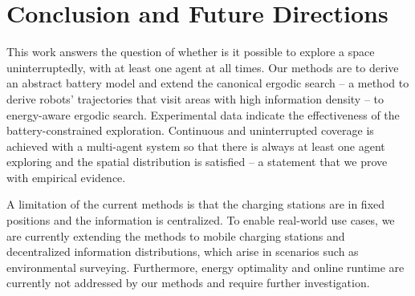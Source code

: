\documentclass[letterpaper,10pt,conference,twoside]{IEEEtran}
\theoremstyle{definition}
\begin{document}
\section{Conclusion and Future Directions}\label{sec:conc}
\noindent
This work %
answers the question of whether is it possible to explore a space uninterruptedly, with at least one agent at all times. %
Our methods are to derive an abstract battery model and extend the canonical ergodic search -- a method to derive robots' trajectories that visit areas with high information density -- to energy-aware ergodic search. %
Experimental data indicate the effectiveness of the battery-constrained exploration. Continuous and uninterrupted coverage is achieved with a multi-agent system so that there is always at least one agent exploring and the spatial distribution is satisfied -- a statement that we prove with empirical evidence.

A limitation of the current methods is that the charging stations are in fixed positions and the information is centralized. To enable real-world use cases, we are currently extending the methods to mobile charging stations and decentralized information distributions, which arise in scenarios such as environmental surveying. Furthermore, energy optimality and online runtime are currently not addressed by our methods and require further investigation. %

{\small
 

}
\end{document}
